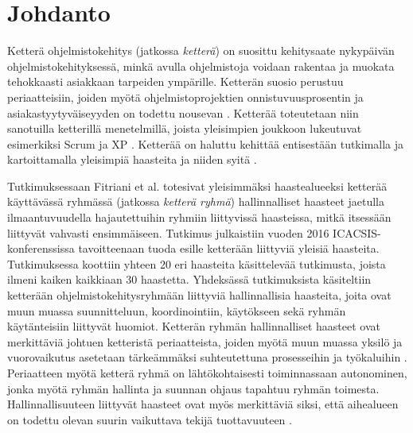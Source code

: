 \chapter{Johdanto\label{intro}}

Ketterä ohjelmistokehitys (jatkossa \textit{ketterä}) on suosittu kehitysaate nykypäivän ohjelmistokehityksessä, minkä avulla ohjelmistoja voidaan rakentaa ja muokata tehokkaasti asiakkaan tarpeiden ympärille. Ketterän suosio perustuu periaatteisiin, joiden myötä ohjelmistoprojektien onnistuvuusprosentin ja asiakastyytyväiseyyden on todettu nousevan \cite{9533020}. Ketterää toteutetaan niin sanotuilla ketterillä menetelmillä, joista yleisimpien joukkoon lukeutuvat esimerkiksi Scrum \cite{SCRUMORG} ja XP \cite{XPORG}. Ketterää on haluttu kehittää entisestään tutkimalla ja kartoittamalla yleisimpiä haasteita ja niiden syitä \cite{7872736}.

Tutkimuksessaan Fitriani et al. \cite{7872736} totesivat yleisimmäksi haastealueeksi ketterää käyttävässä ryhmässä (jatkossa \textit{ketterä ryhmä}) hallinnalliset haasteet jaetulla ilmaantuvuudella hajautettuihin ryhmiin liittyvissä haasteissa, mitkä itsessään liittyvät vahvasti ensimmäiseen. Tutkimus julkaistiin vuoden 2016 ICACSIS-konferenssissa tavoitteenaan tuoda esille ketterään liittyviä yleisiä haasteita. Tutkimuksessa koottiin yhteen 20 eri haasteita käsittelevää tutkimusta, joista ilmeni kaiken kaikkiaan 30 haastetta. Yhdeksässä tutkimuksista käsiteltiin ketterään ohjelmistokehitysryhmään liittyviä hallinnallisia haasteita, joita ovat muun muassa suunnitteluun, koordinointiin, käytökseen sekä ryhmän käytänteisiin liittyvät huomiot. Ketterän ryhmän hallinnalliset haasteet ovat merkittäviä johtuen ketteristä periaatteista, joiden myötä muun muassa yksilö ja vuorovaikutus asetetaan tärkeämmäksi suhteutettuna prosesseihin ja työkaluihin \cite{beck2001agile}. Periaatteen myötä ketterä ryhmä on lähtökohtaisesti toiminnassaan autonominen, jonka myötä ryhmän hallinta ja suunnan ohjaus tapahtuu ryhmän toimesta. Hallinnallisuuteen liittyvät haasteet ovat myös merkittäviä siksi, että aihealueen on todettu olevan suurin vaikuttava tekijä tuottavuuteen \cite{DEOMELO2013412}.

